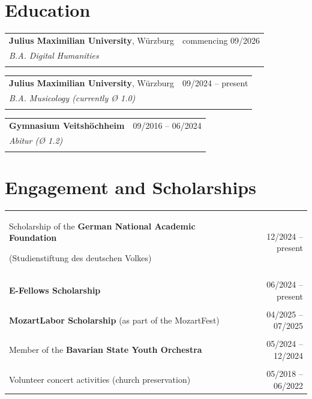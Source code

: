 \documentclass[11pt,a4paper]{article}
\begin{document}
\section{Education}
\begin{tabularx}{\textwidth}{X r}
\textbf{Julius Maximilian University}, Würzburg & commencing 09/2026 \\
\textit{B.A. Digital Humanities} & \\\\
\end{tabularx}
\begin{tabularx}{\textwidth}{X r}
\textbf{Julius Maximilian University}, Würzburg & 09/2024 -- present \\
\textit{B.A. Musicology (currently Ø 1.0)} & \\\\
\end{tabularx}

\begin{tabularx}{\textwidth}{X r}
\textbf{Gymnasium Veitshöchheim} & 09/2016 -- 06/2024 \\
\textit{Abitur (Ø 1.2)} & \\\\
\end{tabularx}

\section{Engagement and Scholarships}

\begin{tabularx}{\textwidth}{X r}
Scholarship of the \textbf{German National Academic Foundation} 

(Studienstiftung des deutschen Volkes) & 12/2024 -- present \\\\
\textbf{E-Fellows Scholarship} & 06/2024 -- present \\\\
\textbf{MozartLabor Scholarship} (as part of the MozartFest) & 04/2025 -- 07/2025 \\\\
Member of the \textbf{Bavarian State Youth Orchestra} & 05/2024 -- 12/2024 \\\\
Volunteer concert activities (church preservation) & 05/2018 -- 06/2022
\end{tabularx}
\end{document}
